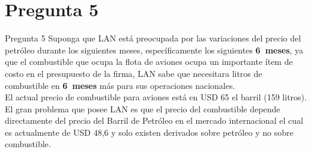 \documentclass{beamer}
\begin{document}
\newcommand{\tcincounomeses}{6} 
\newcommand{\tcincouno}{\frac{6}{12}} 
\newcommand{\litros}{1060000}
\section{Pregunta 5}
\begin{frame}{Pregunta 5}
  \justify
  Suponga que LAN está preocupada por las variaciones del precio del petróleo durante los siguientes meses,
  específicamente los siguientes \textbf{\tcincounomeses\ meses}, ya que el combustible que ocupa la flota de aviones ocupa un importante 
  ítem de costo en el presupuesto de la firma, LAN sabe que necesitara \miles{\litros} litros de combustible en \textbf{\tcincounomeses\ meses}
  más para sus operaciones nacionales.\\
  El actual precio de combustible para aviones está en USD 65 el barril (159 litros). \\
  El gran problema que posee LAN es que el precio del combustible depende directamente del precio del Barril de Petróleo 
  en el mercado internacional el cual es actualmente de USD 48,6 y solo existen derivados sobre petróleo y no sobre combustible.
  
  \end{frame}
  
\end{document}
